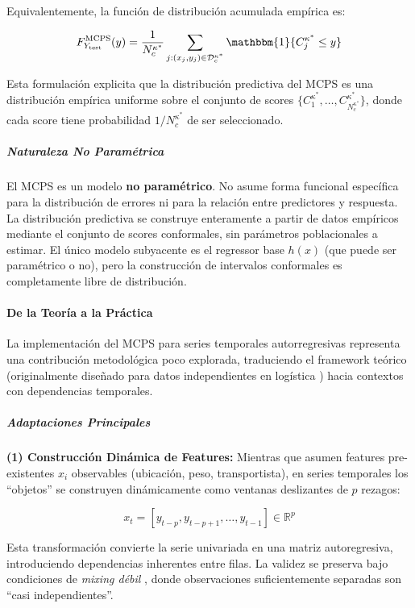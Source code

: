 Equivalentemente, la función de distribución acumulada empírica es:

\begin{equation}
F_{Y_{\text{test}}}^{\text{MCPS}}(y) = \frac{1}{N_c^{\kappa^*}} \sum_{j: (x_j, y_j) \in \mathcal{D}_c^{\kappa^*}} \mathbbm{1}\{C_j^{\kappa^*} \leq y\}
\label{eq:mcps_cdf}
\end{equation}

Esta formulación explicita que la distribución predictiva del MCPS es una distribución empírica uniforme sobre el conjunto de scores $\{C_1^{\kappa^*}, \ldots, C_{N_c^{\kappa^*}}^{\kappa^*}\}$, donde cada score tiene probabilidad $1/N_c^{\kappa^*}$ de ser seleccionado.


\subparagraph{Naturaleza No Paramétrica}

El MCPS es un modelo \textbf{no paramétrico}. No asume forma funcional específica para la distribución de errores ni para la relación entre predictores y respuesta. La distribución predictiva se construye enteramente a partir de datos empíricos mediante el conjunto de scores conformales, sin parámetros poblacionales a estimar. El único modelo subyacente es el regressor base $h(x)$ (que puede ser paramétrico o no), pero la construcción de intervalos conformales es completamente libre de distribución.

\paragraph{De la Teoría a la Práctica}

La implementación del MCPS para series temporales autorregresivas representa una contribución metodológica poco explorada, traduciendo el framework teórico (originalmente diseñado para datos independientes en logística \parencite{Ye2025}) hacia contextos con dependencias temporales.

\subparagraph{Adaptaciones Principales}

\textbf{(1) Construcción Dinámica de Features:} Mientras que \textcite{Ye2025} asumen features pre-existentes $x_i$ observables (ubicación, peso, transportista), en series temporales los ``objetos'' se construyen dinámicamente como ventanas deslizantes de $p$ rezagos:

\begin{equation}
x_t = [y_{t-p}, y_{t-p+1}, \ldots, y_{t-1}] \in \mathbb{R}^p
\end{equation}

Esta transformación convierte la serie univariada en una matriz autoregresiva, introduciendo dependencias inherentes entre filas. La validez se preserva bajo condiciones de \textit{mixing débil} \parencite{Yu1994}, donde observaciones suficientemente separadas son ``casi independientes''.

